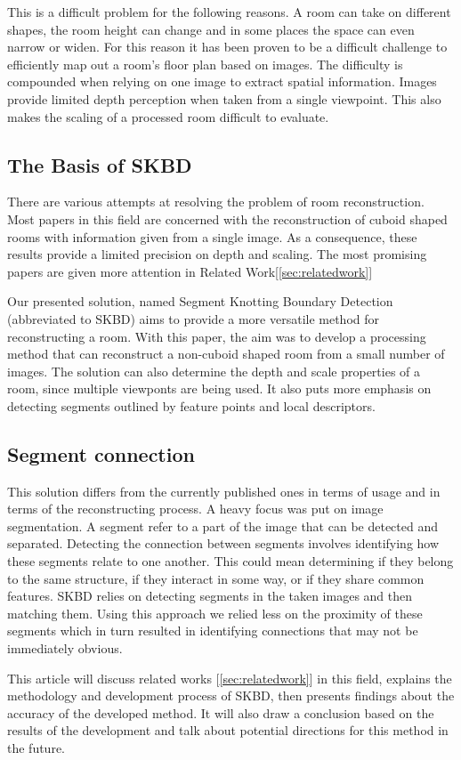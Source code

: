 This is a difficult problem for the following reasons. A room can take on different shapes, the room height can change and in some places the space can even narrow or widen. For this reason it has been proven to be a difficult challenge to efficiently map out a room's floor plan based on images. The difficulty is compounded when relying on one image to extract spatial information. Images provide limited depth perception when taken from a single viewpoint. This also makes the scaling of a processed room difficult to evaluate.
\newpage

\subsection{The Basis of SKBD} %
There are various attempts at resolving the problem of room reconstruction. Most papers in this field are concerned with the reconstruction of cuboid shaped rooms with information given from a single image. As a consequence, these results provide a limited precision on depth and scaling. The most promising papers are given more attention in Related Work[\ref{sec:relatedwork}]

Our presented solution, named Segment Knotting Boundary Detection (abbreviated to SKBD) aims to provide a more versatile method for reconstructing a room. With this paper, the aim was to develop a processing method that can reconstruct a non-cuboid shaped room from a small number of images. The solution can also determine the depth and scale properties of a room, since multiple viewponts are being used. It also puts more emphasis on detecting segments outlined by feature points and local descriptors. 



\subsection{Segment connection} %
This solution differs from the currently published ones in terms of usage and in terms of the reconstructing process. A heavy focus was put on image segmentation. A segment refer to a part of the image that can be detected and separated. Detecting the connection between segments involves identifying how these segments relate to one another. This could mean determining if they belong to the same structure, if they interact in some way, or if they share common features. SKBD relies on detecting segments in the taken images and then matching them. Using this approach we relied less on the proximity of these segments which in turn resulted in identifying connections that may not be immediately obvious.

This article will discuss related works [\ref{sec:relatedwork}] in this field, explains the methodology and development process of SKBD, then presents findings about the accuracy of the developed method. It will also draw a conclusion based on the results of the development and talk about potential directions for this method in the future.




